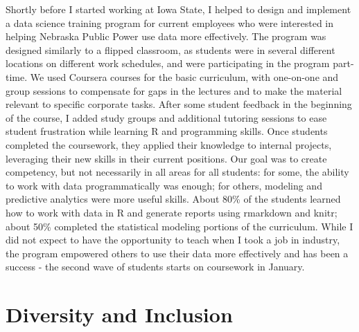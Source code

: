 \documentclass[12pt, letterpaper, sans]{moderncv}
\begin{document}
Shortly before I started working at Iowa State, I helped to design and implement a data science training program for current employees who were interested in helping Nebraska Public Power use data more effectively. The program was designed similarly to a flipped classroom, as students were in several different locations on different work schedules, and were participating in the program part-time. We used Coursera courses for the basic curriculum, with one-on-one and group sessions to compensate for gaps in the lectures and to make the material relevant to specific corporate tasks. After some student feedback in the beginning of the course, I added study groups and additional tutoring sessions to ease student frustration while learning R and programming skills. Once students completed the coursework, they applied their knowledge to internal projects, leveraging their new skills in their current positions. Our goal was to create competency, but not necessarily in all areas for all students: for some, the ability to work with data programmatically was enough; for others, modeling and predictive analytics were more useful skills. About 80\% of the students learned how to work with data in R and generate reports using rmarkdown and knitr; about 50\% completed the statistical modeling portions of the curriculum. While I did not expect to have the opportunity to teach when I took a job in industry, the program empowered others to use their data more effectively and has been a success - the second wave of students starts on coursework in January. 

\clearpage
\section{Diversity and Inclusion}
\end{document}
